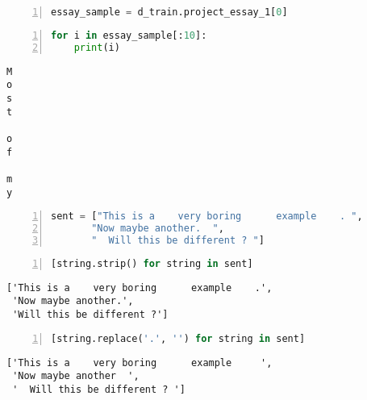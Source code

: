 \documentclass[10pt,parskip=half,
	toc=sectionentrywithdots,
	bibliography=totocnumbered,
	captions=tableheading,numbers=noendperiod]{scrartcl}
\begin{document}
\begin{lstlisting}[language=Python,numbers=left,xleftmargin=20pt,xrightmargin=5pt,belowskip=5pt,aboveskip=5pt]
essay_sample = d_train.project_essay_1[0]
\end{lstlisting}

\begin{lstlisting}[language=Python,numbers=left,xleftmargin=20pt,xrightmargin=5pt,belowskip=5pt,aboveskip=5pt]
for i in essay_sample[:10]:
    print(i)
\end{lstlisting}

\begin{lstlisting}[language={},postbreak={},numbers=none,xrightmargin=7pt,belowskip=5pt,aboveskip=5pt,breakindent=0pt]
M
o
s
t

o
f

m
y

\end{lstlisting}

\begin{lstlisting}[language=Python,numbers=left,xleftmargin=20pt,xrightmargin=5pt,belowskip=5pt,aboveskip=5pt]
sent = ["This is a    very boring      example    . ", 
       "Now maybe another.  ", 
       "  Will this be different ? "]
\end{lstlisting}

\begin{lstlisting}[language=Python,numbers=left,xleftmargin=20pt,xrightmargin=5pt,belowskip=5pt,aboveskip=5pt]
[string.strip() for string in sent]
\end{lstlisting}

\begin{lstlisting}[language={},postbreak={},numbers=none,xrightmargin=7pt,breakindent=0pt,aboveskip=5pt,belowskip=5pt]
['This is a    very boring      example    .',
 'Now maybe another.',
 'Will this be different ?']
\end{lstlisting}

\begin{lstlisting}[language=Python,numbers=left,xleftmargin=20pt,xrightmargin=5pt,belowskip=5pt,aboveskip=5pt]
[string.replace('.', '') for string in sent]
\end{lstlisting}

\begin{lstlisting}[language={},postbreak={},numbers=none,xrightmargin=7pt,breakindent=0pt,aboveskip=5pt,belowskip=5pt]
['This is a    very boring      example     ',
 'Now maybe another  ',
 '  Will this be different ? ']
\end{lstlisting}
\end{document}
